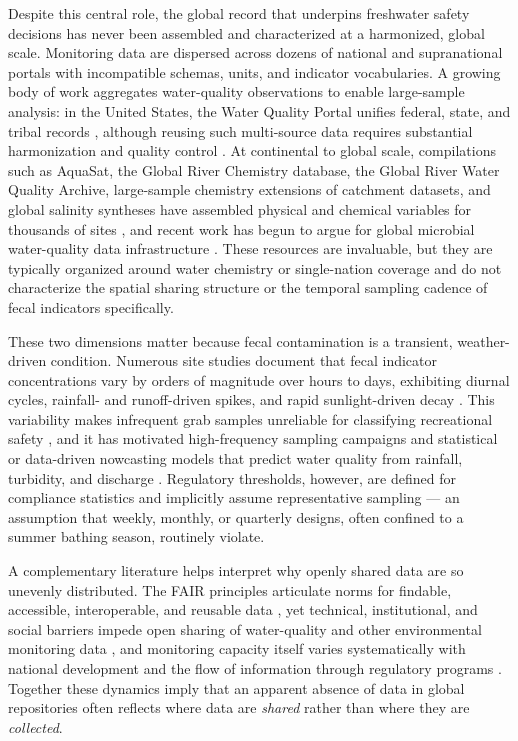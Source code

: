 \documentclass{agujournal2019}
\begin{document}
Despite this central role, the global record that underpins freshwater safety decisions has never been assembled and characterized at a harmonized, global scale. Monitoring data are dispersed across dozens of national and supranational portals with incompatible schemas, units, and indicator vocabularies. A growing body of work aggregates water-quality observations to enable large-sample analysis: in the United States, the Water Quality Portal unifies federal, state, and tribal records \cite{read2017water}, although reusing such multi-source data requires substantial harmonization and quality control \cite{sprague2017challenges,bousquin2024harmonizewq}. At continental to global scale, compilations such as AquaSat, the Global River Chemistry database, the Global River Water Quality Archive, large-sample chemistry extensions of catchment datasets, and global salinity syntheses have assembled physical and chemical variables for thousands of sites \cite{ross2019aquasat,hartmann2014brief,virro2021grqa,sterle2024camelschem,thorslund2020global}, and recent work has begun to argue for global microbial water-quality data infrastructure \cite{rose2023global}. These resources are invaluable, but they are typically organized around water chemistry or single-nation coverage and do not characterize the spatial sharing structure or the temporal sampling cadence of fecal indicators specifically.

These two dimensions matter because fecal contamination is a transient, weather-driven condition. Numerous site studies document that fecal indicator concentrations vary by orders of magnitude over hours to days, exhibiting diurnal cycles, rainfall- and runoff-driven spikes, and rapid sunlight-driven decay \cite{whitman2004escherichia,whitman2004solar,traister2006variability,meays2006diurnal,desai2013escherichia,nguyen2022fecal}. This variability makes infrequent grab samples unreliable for classifying recreational safety \cite{kim2004public}, and it has motivated high-frequency sampling campaigns and statistical or data-driven nowcasting models that predict water quality from rainfall, turbidity, and discharge \cite{searcy2023highfrequency,searcy2021day,heasley2021systematic}. Regulatory thresholds, however, are defined for compliance statistics and implicitly assume representative sampling --- an assumption that weekly, monthly, or quarterly designs, often confined to a summer bathing season, routinely violate.

A complementary literature helps interpret why openly shared data are so unevenly distributed. The FAIR principles articulate norms for findable, accessible, interoperable, and reusable data \cite{wilkinson2016fair}, yet technical, institutional, and social barriers impede open sharing of water-quality and other environmental monitoring data \cite{brasier2017barriers,sugg2021social,hazell2023sociotechnical,heacock2022enhancing}, and monitoring capacity itself varies systematically with national development and the flow of information through regulatory programs \cite{kirschke2020capacity,kumpel2020data}. Together these dynamics imply that an apparent absence of data in global repositories often reflects where data are \emph{shared} rather than where they are \emph{collected}.
\end{document}
